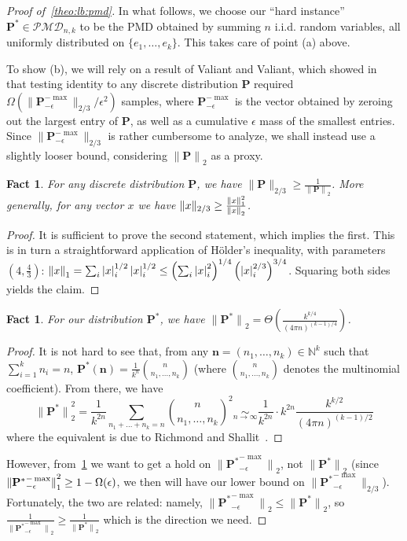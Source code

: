 \documentclass[11pt]{article}
\newtheorem{fact}[theorem]{Fact}
\theoremstyle{definition}
\newcommand{\N}{\mathbb{N}}
\newcommand{\p}{\mathbf{P}}
\newcommand{\eps}{\epsilon}
\newcommand{\abs}[1]{\lvert#1\rvert}
\newcommand{\norm}[1]{\lVert#1\rVert}
\newcommand{\normtwo}[1]{{\norm{#1}}_2}
\renewcommand{\abs}[1]{\left\lvert #1 \right\rvert}
\newcommand{\bigTheta}[1]{{\Theta\left( #1 \right)}}
\newcommand{\bigOmega}[1]{{\Omega\left( #1 \right)}}
\newcommand{\classpmd}[2][n]{\ensuremath{\mathcal{PMD}_{#1,#2}}\xspace}
\begin{document}
\begin{proof}[Proof of~\cref{theo:lb:pmd}]
In what follows, we choose our ``hard instance'' $\p^\ast\in\classpmd[n]{k}$ to be the PMD obtained by summing $n$ i.i.d. random variables, all uniformly distributed on $\{e_1,\dots,e_k\}$. This takes care of point (a) above.

To show (b), we will rely on a result of Valiant and Valiant, which showed in~\cite{VV14} that testing identity to any discrete distribution $\p$ required $\bigOmega{\norm{\p^{-\max}_{-\eps}}_{2/3}/\eps^2}$ samples, where $\p^{-\max}_{-\eps}$ is the vector obtained by zeroing out the largest entry of $\p$, as well as a cumulative $\eps$ mass of the smallest entries. Since $\norm{\p^{-\max}_{-\eps}}_{2/3}$ is rather cumbersome to analyze, we shall instead use a slightly looser bound, considering $\normtwo{\p}$ as a proxy.
\begin{fact}\label{fact:23:2:holder}
For any discrete distribution $\p$, we have $\norm{\p}_{2/3} \geq \frac{1}{\normtwo{\p}}$. More generally, for any vector $x$ we have $\norm{x}_{2/3} \geq \frac{\normone{x}^2}{\normtwo{x}}$.
\end{fact}
\begin{proof}
It is sufficient to prove the second statement, which implies the first. This is in turn a straightforward application of H\"older's inequality, with parameters $(4,\frac{4}{3})$:
$
    \normone{x} = \sum_{i} \abs{x}_i^{1/2}\abs{x}_i^{1/2} \leq \left( \sum_{i} \abs{x}_i^{2}\right) ^{1/4} \left( \abs{x}_i^{2/3}\right)^{3/4}
$. Squaring both sides yields the claim.
\end{proof}
\begin{fact}
For our distribution $\p^\ast$, we have $\normtwo{\p^\ast} = \bigTheta{ \frac{k^{k/4}}{ (4\pi n)^{(k-1)/4}} }$.
\end{fact}
\begin{proof}
It is not hard to see that, from any $\mathbf{n}=(n_1,\dots,n_k)\in\N^k$ such that $\sum_{i=1}^k n_i = n$, $\p^\ast( \mathbf{n} ) = \frac{1}{k^n} \binom{n}{n_1,\dots,n_k}$ (where $\binom{n}{n_1,\dots,n_k}$ denotes the multinomial coefficient). From there, we have
\[
    \normtwo{\p^\ast}^2 = \frac{1}{k^{2n}}\sum_{n_1+\dots+n_k=n} \binom{n}{n_1,\dots,n_k}^2 \operatorname*{\sim}_{n\to\infty} \frac{1}{k^{2n}} \cdot k^{2n}\frac{k^{k/2}}{ (4\pi n)^{(k-1)/2}}
\]
where the equivalent is due to Richmond and Shallit~\cite{RS:08:numbertheory}.
\end{proof}
\noindent However, from~\cref{fact:23:2:holder} we want to get a hold on $\normtwo{{\p^\ast}^{-\max}_{-\eps}}$, not $\normtwo{\p^\ast}$ (since $\normone{{\p^\ast}^{-\max}_{-\eps}}^2 \geq 1-\Omega(\eps)$, we then will have our lower bound on $\norm{{\p^\ast}^{-\max}_{-\eps}}_{2/3}$). Fortunately, the two are related: namely, $\normtwo{{\p^\ast}^{-\max}_{-\eps}}\leq \normtwo{\p^\ast}$, so
$
    \frac{1}{\normtwo{{\p^\ast}^{-\max}_{-\eps}}} \geq \frac{1}{\normtwo{\p^\ast}}
$ which is the direction we need.


\end{proof}
\end{document}
